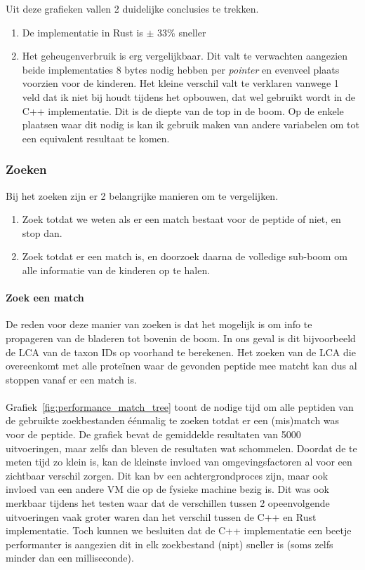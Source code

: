 Uit deze grafieken vallen 2 duidelijke conclusies te trekken.
\begin{enumerate}
    \item De implementatie in Rust is $\pm$ 33\% sneller
    \item Het geheugenverbruik is erg vergelijkbaar.
    Dit valt te verwachten aangezien beide implementaties 8 bytes nodig hebben per \textit{pointer} en evenveel plaats voorzien voor de kinderen.
    Het kleine verschil valt te verklaren vanwege 1 veld dat ik niet bij houdt tijdens het opbouwen, dat wel gebruikt wordt in de C++ implementatie.
    Dit is de diepte van de top in de boom.
    Op de enkele plaatsen waar dit nodig is kan ik gebruik maken van andere variabelen om tot een equivalent resultaat te komen.
\end{enumerate}

\subsubsection{Zoeken}
Bij het zoeken zijn er 2 belangrijke manieren om te vergelijken.
\begin{enumerate}
    \item Zoek totdat we weten als er een match bestaat voor de peptide of niet, en stop dan.
    \item Zoek totdat er een match is, en doorzoek daarna de volledige sub-boom om alle informatie van de kinderen op te halen.

\end{enumerate}

\paragraph{Zoek een match}
De reden voor deze manier van zoeken is dat het mogelijk is om info te propageren van de bladeren tot bovenin de boom.
In ons geval is dit bijvoorbeeld de LCA van de taxon IDs op voorhand te berekenen.
Het zoeken van de LCA die overeenkomt met alle proteïnen waar de gevonden peptide mee matcht kan dus al stoppen vanaf er een match is.
\\ \\
Grafiek~\ref{fig:performance_match_tree} toont de nodige tijd om alle peptiden van de gebruikte zoekbestanden éénmalig te zoeken totdat er een (mis)match was voor de peptide.
De grafiek bevat de gemiddelde resultaten van 5000 uitvoeringen, maar zelfs dan bleven de resultaten wat schommelen.
Doordat de te meten tijd zo klein is, kan de kleinste invloed van omgevingsfactoren al voor een zichtbaar verschil zorgen.
Dit kan bv een achtergrondproces zijn, maar ook invloed van een andere VM die op de fysieke machine bezig is.
Dit was ook merkbaar tijdens het testen waar dat de verschillen tussen 2 opeenvolgende uitvoeringen vaak groter waren dan het verschil tussen de C++ en Rust implementatie.
Toch kunnen we besluiten dat de C++ implementatie een beetje performanter is aangezien dit in elk zoekbestand (nipt) sneller is (soms zelfs minder dan een milliseconde).

